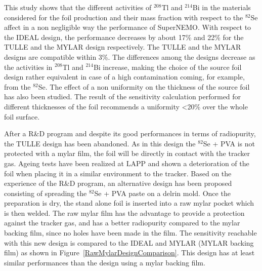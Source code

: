 \documentclass[main.tex]{subfiles}
\begin{document}
\NI This study shows that the different activities of $^{\text{208}}$Tl and $^{\text{214}}$Bi in the materials considered for the foil production and their mass fraction with respect to the $^{\text{82}}$Se affect in a non negligible way the performance of SuperNEMO. With respect to the IDEAL design, the performance decreases by about 17\% and 22\% for the TULLE and the MYLAR design respectively. The TULLE and the MYLAR designs are compatible within 3\%. The differences among the designs decrease as the activities in $^{\text{208}}$Tl and $^{\text{214}}$Bi increase, making the choice of the source foil design rather equivalent in case of a high contamination coming, for example, from the $^{\text{82}}$Se. The effect of a non uniformity on the thickness of the source foil has also been studied. The result of the sensitivity calculation performed for different thicknesses of the foil recommends a uniformity <20\% over the whole foil surface.


\bigskip


\NI After a R\&D program and despite its good performances in terms of radiopurity, the TULLE design has been abandoned. As in this design the $^{\text{82}}$Se + PVA is not protected with a mylar film, the foil will be directly in contact with the tracker gas. Ageing tests have been realized at LAPP and shown a deterioration of the foil when placing it in a similar environment to the tracker. Based on the experience of the R\&D program, an alternative design has been proposed consisting of spreading the $^{\text{82}}$Se + PVA paste on a delrin mold. Once the preparation is dry, the stand alone foil is inserted into a raw mylar pocket which is then welded. The raw mylar film has the advantage to provide a protection against the tracker gas, and has a better radiopurity compared to the mylar backing film, since no holes have been made in the film. The sensitivity reachable with this new design is compared to the IDEAL and MYLAR (MYLAR backing film) as shown in Figure~\ref{RawMylarDesignComparison}. This design has at least similar performances than the design using a mylar backing film.
 

\end{document}
